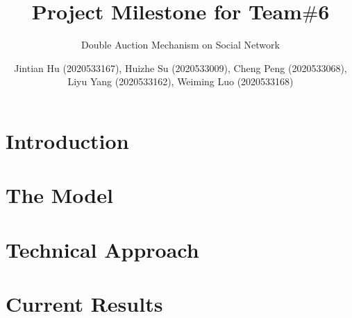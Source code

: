 \documentclass[format=acmsmall, review=false, natbib=false]{acmart}
\title{Project Milestone for Team$\#$6}
\subtitle{Double Auction Mechanism on Social Network}
\author{Jintian Hu (2020533167), Huizhe Su (2020533009), Cheng Peng (2020533068), Liyu Yang (2020533162), Weiming Luo (2020533168)}
\begin{document}
\maketitle

\section{Introduction}


\section{The Model}


\section{Technical Approach}


\section{Current Results}


\nocite{*}

\printbibliography
\end{document}
